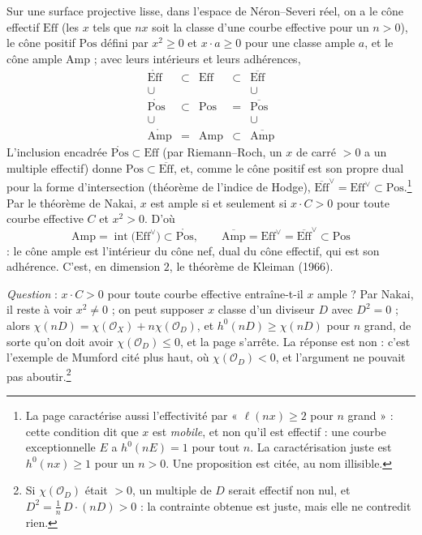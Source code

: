 \documentclass[11pt,a4paper]{article}
\begin{document}
Sur une surface projective lisse, dans l'espace de Néron--Severi réel, on a le
cône effectif $\mathrm{Eff}$ (les $x$ tels que $nx$ soit la classe d'une courbe
effective pour un $n > 0$), le cône positif $\mathrm{Pos}$ défini par $x^{2}
\geqslant 0$ et $x \cdot a \geqslant 0$ pour une classe ample $a$, et le cône
ample $\mathrm{Amp}$ ; avec leurs intérieurs et leurs adhérences,
\[
\begin{array}{ccccc}
\mathring{\mathrm{Eff}} & \subset & \mathrm{Eff} & \subset & \overline{\mathrm{Eff}} \\
\cup & & & & \cup \\
\mathring{\mathrm{Pos}} & \subset & \mathrm{Pos} & = & \overline{\mathrm{Pos}} \\
\cup & & & & \cup \\
\mathring{\mathrm{Amp}} & = & \mathrm{Amp} & \subset & \overline{\mathrm{Amp}}
\end{array}
\]
L'inclusion encadrée $\mathring{\mathrm{Pos}} \subset \mathrm{Eff}$ (par
Riemann--Roch, un $x$ de carré $> 0$ a un multiple effectif) donne
$\mathrm{Pos} \subset \overline{\mathrm{Eff}}$, et, comme le cône positif est
son propre dual pour la forme d'intersection (théorème de l'indice de Hodge),
$\overline{\mathrm{Eff}}^{\vee} = \mathrm{Eff}^{\vee} \subset
\mathrm{Pos}$.\footnote{La page caractérise aussi l'effectivité par « $\ell(nx)
\geqslant 2$ pour $n$ grand » : cette condition dit que $x$ est
\emph{mobile}, et non qu'il est effectif : une courbe exceptionnelle $E$ a
$h^{0}(nE) = 1$ pour tout $n$. La caractérisation juste est $h^{0}(nx)
\geqslant 1$ pour un $n > 0$. Une proposition est citée, au nom illisible.}
Par le théorème de Nakai, $x$ est ample si et seulement si $x \cdot C > 0$ pour
toute courbe effective $C$ et $x^{2} > 0$. D'où
\[
\boxed{\;\mathrm{Amp} = \operatorname{int}\bigl(\mathrm{Eff}^{\vee}\bigr) \subset
\mathring{\mathrm{Pos}} , \qquad \overline{\mathrm{Amp}} = \mathrm{Eff}^{\vee} =
\overline{\mathrm{Eff}}^{\vee} \subset \mathrm{Pos}\;}
\]
: le cône ample est l'intérieur du cône nef, dual du cône effectif, qui est
son adhérence. C'est, en dimension $2$, le théorème de Kleiman (1966).

\emph{Question} : $x \cdot C > 0$ pour toute courbe effective entraîne-t-il $x$
ample ? Par Nakai, il reste à voir $x^{2} \neq 0$ ; on peut supposer $x$ classe
d'un diviseur $D$ avec $D^{2} = 0$ ; alors $\chi(nD) = \chi(\mathcal{O}_{X}) +
n\chi(\mathcal{O}_{D})$, et $h^{0}(nD) \geqslant \chi(nD)$ pour $n$ grand, de sorte
qu'on doit avoir $\chi(\mathcal{O}_{D}) \leqslant 0$, et la page s'arrête.
La réponse est non : c'est l'exemple de Mumford cité plus haut, où
$\chi(\mathcal{O}_{D}) < 0$, et l'argument ne pouvait pas aboutir.\footnote{Si
$\chi(\mathcal{O}_{D})$ était $> 0$, un multiple de $D$ serait effectif non nul,
et $D^{2} = \frac{1}{n}\,D\cdot(nD) > 0$ : la contrainte obtenue est juste, mais
elle ne contredit rien.}
\end{document}
